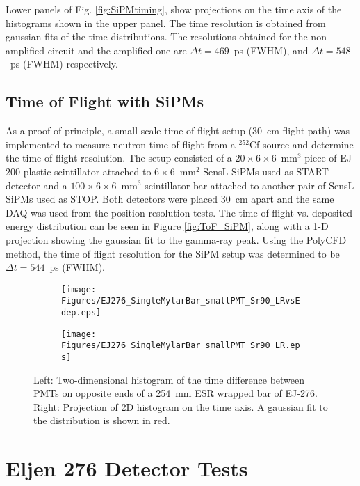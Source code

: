 Lower panels of Fig. \ref{fig:SiPMtiming}, show projections on the time axis of the histograms shown in the upper panel. The time resolution is obtained from  gaussian fits of the time distributions. The resolutions obtained for the non-amplified circuit and the amplified one are $\Delta t=469$~ps (FWHM), and $\Delta t=548$~ps (FWHM) respectively.

\subsection{Time of Flight with SiPMs}

As a proof of principle, a small scale time-of-flight setup (30~cm flight path) was implemented to measure neutron time-of-flight from a $^{252}$Cf source and determine the time-of-flight resolution. The setup consisted of a $20\times6\times6$~mm$^3$  piece of EJ-200 plastic scintillator attached to $6\times6$~mm$^2$ SensL\textsuperscript{\textregistered} SiPMs used as START detector and a  $100\times6\times6$~mm$^3$ scintillator bar attached to another pair of SensL\textsuperscript{\textregistered} SiPMs used as STOP. Both detectors were placed 30~cm apart and the same DAQ was used from the position resolution tests. The time-of-flight vs. deposited energy distribution can be seen in Figure \ref{fig:ToF_SiPM}, along with a 1-D projection showing the gaussian fit to the gamma-ray peak. Using the PolyCFD method, the time of flight resolution for the SiPM setup was determined to be $\Delta t=544$~ps (FWHM).
\begin{figure}[bt]
  \centering
  \begin{subfigure}{0.5\linewidth}
    \raggedleft
    \texttt{[image: Figures/EJ276\_SingleMylarBar\_smallPMT\_Sr90\_LRvsEdep.eps]}
  \end{subfigure}%
  \begin{subfigure}{0.5\linewidth}
    \raggedright
    \texttt{[image: Figures/EJ276\_SingleMylarBar\_smallPMT\_Sr90\_LR.eps]}
  \end{subfigure}%
  \caption{Left: Two-dimensional histogram of the time difference between PMTs on opposite ends of a 254~mm ESR wrapped bar of EJ-276. Right: Projection of 2D histogram on the time axis. A gaussian fit to the distribution is shown in red.}
  \label{fig:MylarTiming}
\end{figure}

\section{Eljen 276 Detector Tests}

